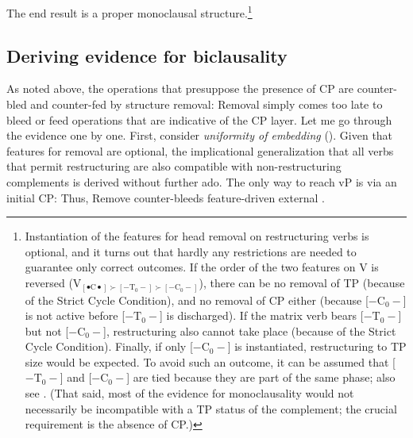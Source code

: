 \documentclass[output=paper]{langsci/langscibook}
\begin{document}

The end result is a proper monoclausal
structure.\footnote{\label{whytp}Instantiation of the features for head
removal on restructuring   verbs is optional, and it turns out that
hardly any restrictions are needed to guarantee only correct outcomes. If the
order of the two features on V is reversed (V$_{[\bullet\text{C}\bullet] \succ
[-\text{T}_0-] \succ [-\text{C}_0-]}$), there can be no removal of TP (because of the Strict
Cycle Condition), and no removal of CP either (because [$-\text{C}_0-$] is not
active before [$-\text{T}_0-$] is discharged).  If the matrix verb  bears
[$-\text{T}_0-$] but not [$-\text{C}_0-$], restructuring also cannot take place
(because of the Strict Cycle Condition). Finally, if only [$-\text{C}_0-$] is
instantiated, restructuring to TP size would be expected. To avoid such an
outcome, it can be assumed that [$-\text{T}_0-$] and [$-\text{C}_0-$] are tied
because they are part of the same phase; also see \cite{Pesetsky:16}. (That
said, most of the evidence for monoclausality would not necessarily be
incompatible with a TP status of the complement; the crucial requirement is the
absence of CP.)}

\subsection{Deriving evidence for biclausality}

As noted above, the operations that presuppose the presence of CP are
counter-bled and counter-fed by structure removal: Removal simply comes too
late to bleed or feed operations that are indicative of the CP layer. Let me
go through the evidence one by one. First, consider {\itshape uniformity of
embedding} ().  Given that features for removal are
optional, the implicational generalization that all  verbs that permit
restructuring are also compatible with non-restructuring complements is
derived without further ado. The only way to reach vP is via an initial CP:
Thus, Remove counter-bleeds feature-driven external .
\end{document}

